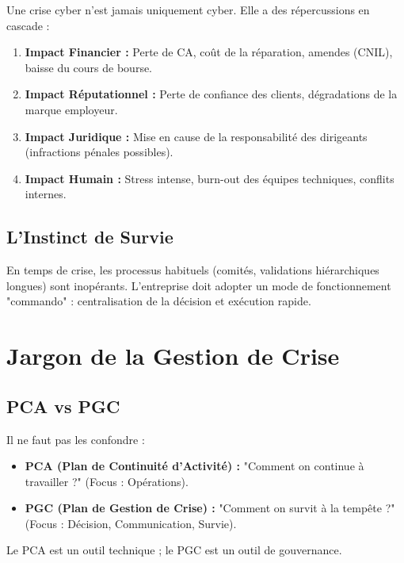 Une crise cyber n'est jamais uniquement cyber. Elle a des répercussions en cascade :

\begin{enumerate}
    \item \textbf{Impact Financier :} Perte de CA, coût de la réparation, amendes (CNIL), baisse du cours de bourse.
    \item \textbf{Impact Réputationnel :} Perte de confiance des clients, dégradations de la marque employeur.
    \item \textbf{Impact Juridique :} Mise en cause de la responsabilité des dirigeants (infractions pénales possibles).
    \item \textbf{Impact Humain :} Stress intense, burn-out des équipes techniques, conflits internes.
\end{enumerate}

\subsection{L'Instinct de Survie}

En temps de crise, les processus habituels (comités, validations hiérarchiques longues) sont inopérants. L'entreprise doit adopter un mode de fonctionnement "commando" : centralisation de la décision et exécution rapide.

\section{Jargon de la Gestion de Crise}

\subsection{PCA vs PGC}

Il ne faut pas les confondre :

\begin{itemize}
    \item \textbf{PCA (Plan de Continuité d'Activité) :} "Comment on continue à travailler ?" (Focus : Opérations).
    \item \textbf{PGC (Plan de Gestion de Crise) :} "Comment on survit à la tempête ?" (Focus : Décision, Communication, Survie).
\end{itemize}

Le PCA est un outil technique ; le PGC est un outil de gouvernance.

